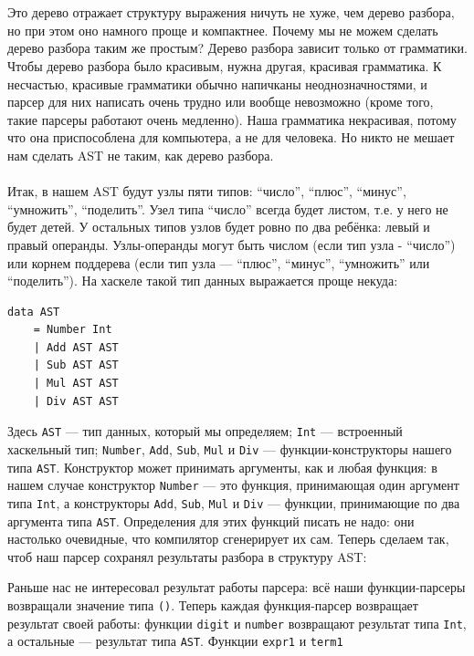 \documentclass[11pt]{book}
\begin{document}
\\ \\
Это дерево отражает структуру выражения ничуть не хуже,
чем дерево разбора, но при этом оно намного проще и компактнее. Почему мы не можем
сделать дерево разбора таким же простым? Дерево разбора зависит только от грамматики.
Чтобы дерево разбора было красивым, нужна другая, красивая грамматика. К несчастью,
красивые грамматики обычно напичканы неоднозначностями, и парсер для них написать
очень трудно или вообще невозможно (кроме того, такие парсеры работают очень медленно).
Наша грамматика некрасивая, потому что она приспособлена для компьютера, а не для человека.
Но никто не мешает нам сделать AST не таким, как дерево разбора.
\\ \\
Итак, в нашем AST будут узлы пяти типов: ``число'', ``плюс'', ``минус'', ``умножить'', ``поделить''.
Узел типа ``число'' всегда будет листом, т.е. у него не будет детей. У остальных типов
узлов будет ровно по два ребёнка: левый и правый операнды. Узлы-операнды могут быть числом
(если тип узла - ``число'') или корнем поддерева (если тип узла --- ``плюс'', ``минус'', ``умножить'' или ``поделить'').
На хаскеле такой тип данных выражается проще некуда:
\begin{verbatim}
data AST
    = Number Int
    | Add AST AST
    | Sub AST AST
    | Mul AST AST
    | Div AST AST
\end{verbatim}
Здесь \texttt{AST} --- тип данных, который мы определяем;
\texttt{Int} --- встроенный хаскельный тип; \texttt{Number},
\texttt{Add}, \texttt{Sub}, \texttt{Mul} и \texttt{Div} ---
функции-конструкторы нашего типа \texttt{AST}. Конструктор может принимать аргументы, как и любая функция:
в нашем случае конструктор \texttt{Number} --- это функция, принимающая один аргумент типа \texttt{Int},
а конструкторы \texttt{Add}, \texttt{Sub}, \texttt{Mul} и \texttt{Div} ---
функции, принимающие по два аргумента типа \texttt{AST}. Определения для этих функций писать не надо:
они настолько очевидные, что компилятор сгенерирует их сам.
Теперь сделаем так, чтоб наш парсер сохранял результаты разбора в структуру AST:

Раньше нас не интересовал результат работы парсера: всё наши
функции-парсеры возвращали значение типа \texttt{()}. Теперь каждая функция-парсер возвращает результат
своей работы: функции \texttt{digit} и \texttt{number} возвращают результат типа \texttt{Int},
а остальные --- результат типа \texttt{AST}. Функции \texttt{expr1} и \texttt{term1}
\end{document}
